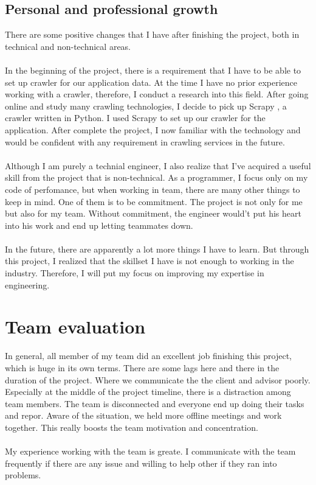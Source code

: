 \subsection{Personal and professional growth}
There are some positive changes that I have after finishing the project, both in technical and non-technical areas.
\\
\\
In the beginning of the project, there is a requirement that I have to be able to set up crawler for our application data. At the time I have no prior experience working with a crawler, therefore, I conduct a research into this field. After going online and study many crawling technologies, I decide to pick up Scrapy \cite{scrapy}, a crawler written in Python. I used Scrapy to set up our crawler for the application. After complete the project, I now familiar with the technology and would be confident with any requirement in crawling services in the future.
\\
\\
Although I am purely a technial engineer, I also realize that I've acquired a useful skill from the project that is non-technical. As a programmer, I focus only on my code of perfomance, but when working in team, there are many other things to keep in mind. One of them is to be commitment. The project is not only for me but also for my team. Without commitment, the engineer would't put his heart into his work and end up letting teammates down.
\\
\\
In the future, there are apparently a lot more things I have to learn. But through this project, I realized that the skillset I have is not enough to working in the industry. Therefore, I will put my focus on improving my expertise in engineering.
\section{Team evaluation}
In general, all member of my team did an excellent job finishing this project, which is huge in its own terms. There are some lags here and there in the duration of the project. Where we communicate the the client and advisor poorly. Especially at the middle of the project timeline, there is a distraction among team members. The team is disconnected and everyone end up doing their tasks and repor. Aware of the situation, we held more offline meetings and work together. This really boosts the team motivation and concentration. 
\\
\\
My experience working with the team is greate. I communicate with the team frequently if there are any issue and willing to help other if they ran into problems.